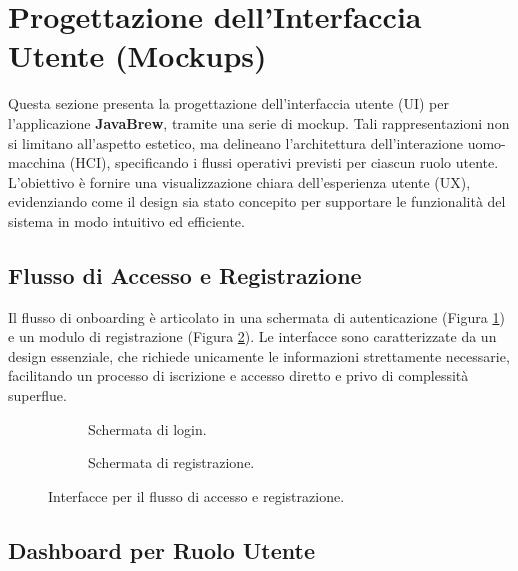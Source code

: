 
\section{Progettazione dell'Interfaccia Utente (Mockups)}

Questa sezione presenta la progettazione dell'interfaccia utente (UI) per l'applicazione \textbf{JavaBrew}, tramite una serie di mockup. Tali rappresentazioni non si limitano all'aspetto estetico, ma delineano l'architettura dell'interazione uomo-macchina (HCI), specificando i flussi operativi previsti per ciascun ruolo utente. L'obiettivo è fornire una visualizzazione chiara dell'esperienza utente (UX), evidenziando come il design sia stato concepito per supportare le funzionalità del sistema in modo intuitivo ed efficiente.

\subsection{Flusso di Accesso e Registrazione}

Il flusso di onboarding è articolato in una schermata di autenticazione (Figura \ref{fig:login}) e un modulo di registrazione (Figura \ref{fig:register}). Le interfacce sono caratterizzate da un design essenziale, che richiede unicamente le informazioni strettamente necessarie, facilitando un processo di iscrizione e accesso diretto e privo di complessità superflue.

\begin{figure}[H]
    \centering
    \begin{subfigure}[t]{0.48\textwidth}
        \centering
        \caption{Schermata di login.}
        \label{fig:login}
    \end{subfigure}
    \hfill %
    \begin{subfigure}[t]{0.48\textwidth}
        \centering
        \caption{Schermata di registrazione.}
        \label{fig:register}
    \end{subfigure}
    \caption{Interfacce per il flusso di accesso e registrazione.}
    \label{fig:login_register}
\end{figure}

\subsection{Dashboard per Ruolo Utente}

